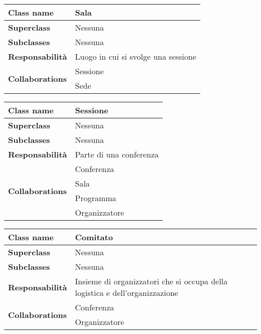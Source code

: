 \begin{table}[h!]
\begin{tabular}{|l|l|}
			\hline
	\textbf{Class name} & Sala \\ \hline
	\textbf{Superclass} & Nessuna \\ \hline
	\textbf{Subclasses} & Nessuna  \\ \hline
	\textbf{Responsabilità} & Luogo in cui si svolge una sessione \\ \hline
	\multirow{2}{*}{\textbf{Collaborations}} & Sessione \\ 
	& Sede \\ \hline
\end{tabular}
\end{table}
\begin{table}[h!]
\begin{tabular}{|l|l|}
			\hline
	\textbf{Class name} & Sessione \\ \hline
	\textbf{Superclass} & Nessuna \\ \hline
	\textbf{Subclasses} & Nessuna  \\ \hline
	\textbf{Responsabilità} & Parte di una conferenza \\ \hline
	\multirow{4}{*}{\textbf{Collaborations}} & Conferenza \\ 
	& Sala \\
	& Programma \\
	& Organizzatore \\ \hline
\end{tabular}
\end{table}

\begin{table}[h!]
\begin{tabular}{|l|l|}
	\hline
	\textbf{Class name} & Comitato \\ \hline
	\textbf{Superclass} & Nessuna \\ \hline
	\textbf{Subclasses} & Nessuna  \\ \hline
	\textbf{Responsabilità} & Insieme di organizzatori che si occupa della logistica e dell'organizzazione \\ \hline
	\multirow{2}{*}{\textbf{Collaborations}} & Conferenza \\ 
	& Organizzatore \\ \hline
\end{tabular}
\end{table}

